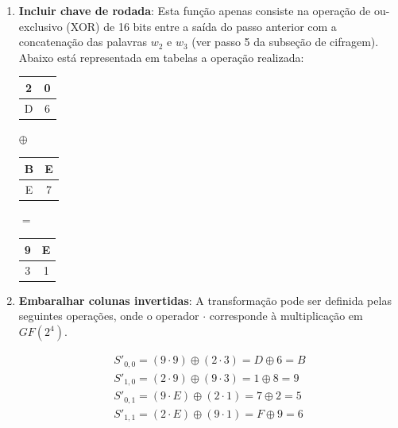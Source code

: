 \documentclass{article}
\begin{document}
\begin{enumerate}
    \item \textbf{Incluir chave de rodada}: Esta função apenas consiste na
    operação de ou-exclusivo (XOR) de 16 bits entre a saída do passo anterior
    com a concatenação das palavras $w_{2}$ e $w_{3}$ (ver passo 5 da subseção
    de cifragem). Abaixo está representada em tabelas a operação realizada:
    \begin{center}
        \begin{tabular}{|c|c|}
            \hline
            2 & 0  \\
            \hline
            D & 6 \\
            \hline
        \end{tabular}
        $\oplus$
        \begin{tabular}{|c|c|}
            \hline
            B & E  \\
            \hline
            E & 7 \\
            \hline
        \end{tabular}
        $=$
        \begin{tabular}{|c|c|}
            \hline
            9 & E  \\
            \hline
            3 & 1 \\
            \hline
        \end{tabular}
    \end{center}
    
    \item \textbf{Embaralhar colunas invertidas}: A transformação pode ser
    definida pelas seguintes operações, onde o operador $\cdot$ corresponde à
    multiplicação em $GF(2^{4})$.
    \begin{center}
        \begin{gather*}
            S'_{0,0} = (9 \cdot 9) \oplus (2 \cdot 3) = D \oplus 6 = B \\
            S'_{1,0} = (2 \cdot 9) \oplus (9 \cdot 3) = 1 \oplus 8 = 9 \\
            S'_{0,1} = (9 \cdot E) \oplus (2 \cdot 1) = 7 \oplus 2 = 5 \\
            S'_{1,1} = (2 \cdot E) \oplus (9 \cdot 1) = F \oplus 9 = 6
        \end{gather*}
    \end{center}
    

\end{enumerate}
\end{document}
